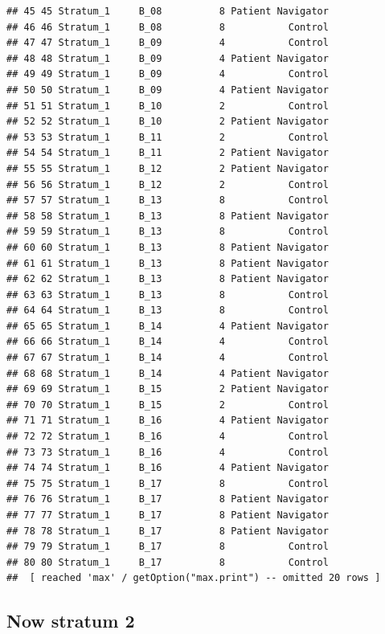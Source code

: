 \documentclass[
]{book}
\begin{document}
\begin{verbatim}
## 45 45 Stratum_1     B_08          8 Patient Navigator
## 46 46 Stratum_1     B_08          8           Control
## 47 47 Stratum_1     B_09          4           Control
## 48 48 Stratum_1     B_09          4 Patient Navigator
## 49 49 Stratum_1     B_09          4           Control
## 50 50 Stratum_1     B_09          4 Patient Navigator
## 51 51 Stratum_1     B_10          2           Control
## 52 52 Stratum_1     B_10          2 Patient Navigator
## 53 53 Stratum_1     B_11          2           Control
## 54 54 Stratum_1     B_11          2 Patient Navigator
## 55 55 Stratum_1     B_12          2 Patient Navigator
## 56 56 Stratum_1     B_12          2           Control
## 57 57 Stratum_1     B_13          8           Control
## 58 58 Stratum_1     B_13          8 Patient Navigator
## 59 59 Stratum_1     B_13          8           Control
## 60 60 Stratum_1     B_13          8 Patient Navigator
## 61 61 Stratum_1     B_13          8 Patient Navigator
## 62 62 Stratum_1     B_13          8 Patient Navigator
## 63 63 Stratum_1     B_13          8           Control
## 64 64 Stratum_1     B_13          8           Control
## 65 65 Stratum_1     B_14          4 Patient Navigator
## 66 66 Stratum_1     B_14          4           Control
## 67 67 Stratum_1     B_14          4           Control
## 68 68 Stratum_1     B_14          4 Patient Navigator
## 69 69 Stratum_1     B_15          2 Patient Navigator
## 70 70 Stratum_1     B_15          2           Control
## 71 71 Stratum_1     B_16          4 Patient Navigator
## 72 72 Stratum_1     B_16          4           Control
## 73 73 Stratum_1     B_16          4           Control
## 74 74 Stratum_1     B_16          4 Patient Navigator
## 75 75 Stratum_1     B_17          8           Control
## 76 76 Stratum_1     B_17          8 Patient Navigator
## 77 77 Stratum_1     B_17          8 Patient Navigator
## 78 78 Stratum_1     B_17          8 Patient Navigator
## 79 79 Stratum_1     B_17          8           Control
## 80 80 Stratum_1     B_17          8           Control
##  [ reached 'max' / getOption("max.print") -- omitted 20 rows ]
\end{verbatim}

\hypertarget{now-stratum-2}{%
\subsection{Now stratum 2}\label{now-stratum-2}}
\end{document}
